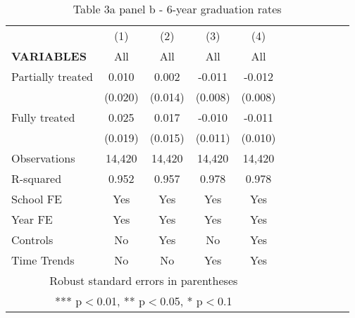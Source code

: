 \documentclass{article}
\begin{document}

\begin{table}[htbp]
\centering
\caption{Table 3a panel b - 6-year graduation rates}
\begin{tabular}{lcccccccccc}
\toprule
 & (1) & (2) & (3) & (4) \\
\cmidrule(lr){2-5}
\textbf{VARIABLES} & All & All & All & All \\
\midrule
Partially treated & 0.010 & 0.002 & -0.011 & -0.012 \\
 & (0.020) & (0.014) & (0.008) & (0.008) \\
Fully treated & 0.025 & 0.017 & -0.010 & -0.011 \\
 & (0.019) & (0.015) & (0.011) & (0.010) \\
\midrule
Observations & 14,420 & 14,420 & 14,420 & 14,420  \\
R-squared & 0.952 & 0.957 & 0.978 & 0.978  \\
\midrule
School FE & Yes & Yes & Yes & Yes\\
Year FE & Yes & Yes & Yes & Yes  \\
Controls & No & Yes & No & Yes  \\
 Time Trends & No & No & Yes & Yes  \\ 
\midrule
\multicolumn{5}{c}{Robust standard errors in parentheses} \\
\multicolumn{5}{c}{*** p$<$0.01, ** p$<$0.05, * p$<$0.1} \\
\bottomrule
\end{tabular}
\end{table}

\end{document}
